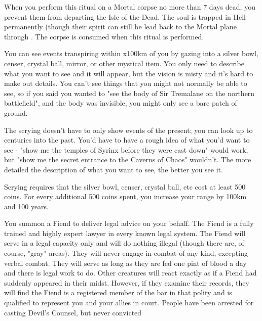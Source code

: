 {\OCCULT[
  Name=Damning,
  Link=occultism-damning,
  Success=5,
  Cost=6666,
  Widdershins=0
]

When you perform this ritual on a Mortal corpse no more than 7 days dead, you prevent them from departing the Isle of the Dead.  The soul is trapped in Hell permanently (though their spirit can still be lead back to the Mortal plane through .  The corpse is consumed when this ritual is performed.


\OCCULT[
  Name=Descry,
  Link=occultism-descry,
  Success=2,
  Cost=500+,
  Widdershins=0
]

You can see events transpiring within \LVL x100km of you by gazing into a silver bowl, censer, crystal ball, mirror, or other mystical item.  You only need to describe what you want to see and it will appear, but the vision is misty and it's hard to make out details.  You can't see things that you might not normally be able to see, so if you said you wanted to "see the body of Sir Tremalane on the northern battlefield", and the body was invisible, you might only see a bare patch of ground.  

The scrying doesn't have to only show events of the present; you can look up to \LVL centuries into the past.  You'd have to have a rough idea of what you'd want to see - "show me the temples of Syrinx before they were cast down" would work, but "show me the secret entrance to the Caverns of Chaos" wouldn't.  The more detailed the description of what you want to see, the better you see it.

Scrying requires that the silver bowl, censer, crystal ball, etc cost at least 500 coins.  For every additional 500 coins spent, you increase your range by 100km and 100 years.

\OCCULT[
  Name=Devil's Counsel,
  Link=occultism-devils-counsel,
  Success=4,
  Cost=See below,
  Widdershins=2
]

You summon a Fiend to deliver legal advice on your behalf.  The Fiend is a fully trained and highly expert lawyer in every known legal system. The Fiend will serve in a legal capacity only and will do nothing illegal (though there are, of course, "gray" areas). They will never engage in combat of any kind, excepting verbal combat. They will serve as long as they are fed one pint of blood a day and there is legal work to do. Other creatures will react exactly as if a Fiend had suddenly appeared in their midst. However, if they examine their records, they will find the Fiend is a registered member of the bar in that polity and is qualified to represent you and your allies in court. People have been arrested for casting Devil's Counsel, but never convicted

}

